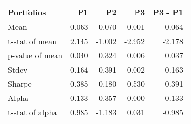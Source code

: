 \begin{tabular}{lrrrr}
\toprule
Portfolios & P1 & P2 & P3 & P3 - P1 \\
\midrule
Mean & 0.063 & -0.070 & -0.001 & -0.064 \\
t-stat of mean & 2.145 & -1.002 & -2.952 & -2.178 \\
p-value of mean & 0.040 & 0.324 & 0.006 & 0.037 \\
Stdev & 0.164 & 0.391 & 0.002 & 0.163 \\
Sharpe & 0.385 & -0.180 & -0.530 & -0.391 \\
Alpha & 0.133 & -0.357 & 0.000 & -0.133 \\
t-stat of alpha & 0.985 & -1.183 & 0.031 & -0.985 \\
\bottomrule
\end{tabular}
